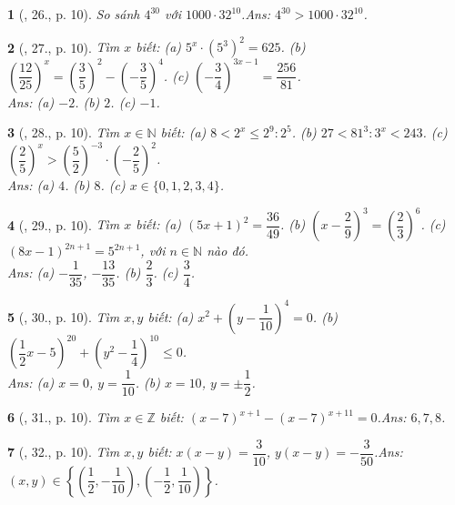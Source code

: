 \documentclass{article}
\newtheorem{baitoan}{}
\begin{document}
\begin{baitoan}[\cite{Tuyen_Toan_7}, 26., p. 10]
	So sánh $4^{30}$ với $1000\cdot 32^{10}$.\hfill{\sf Ans: $4^{30} > 1000\cdot 32^{10}$.}
\end{baitoan}

\begin{baitoan}[\cite{Tuyen_Toan_7}, 27., p. 10]
	Tìm $x$ biết: (a) $5^x\cdot(5^3)^2 = 625$. (b) $\left(\dfrac{12}{25}\right)^x = \left(\dfrac{3}{5}\right)^2 - \left(-\dfrac{3}{5}\right)^4$. (c) $\left(-\dfrac{3}{4}\right)^{3x - 1} = \dfrac{256}{81}$.\\\mbox{}\hfill{\sf Ans: (a) $-2$. (b) $2$. (c) $-1$.}
\end{baitoan}

\begin{baitoan}[\cite{Tuyen_Toan_7}, 28., p. 10]
	Tìm $x\in\mathbb{N}$ biết: (a) $8 < 2^x\le 2^9:2^5$. (b) $27 < 81^3:3^x < 243$. (c) $\left(\dfrac{2}{5}\right)^x > \left(\dfrac{5}{2}\right)^{-3}\cdot\left(-\dfrac{2}{5}\right)^2$.\\\mbox{}\hfill{\sf Ans: (a) $4$. (b) $8$. (c) $x\in\{0,1,2,3,4\}$.}
\end{baitoan}

\begin{baitoan}[\cite{Tuyen_Toan_7}, 29., p. 10]
	Tìm $x$ biết: (a) $(5x + 1)^2 = \dfrac{36}{49}$. (b) $\left(x - \dfrac{2}{9}\right)^3 = \left(\dfrac{2}{3}\right)^6$. (c) $(8x - 1)^{2n + 1} = 5^{2n + 1}$, với $n\in\mathbb{N}$ nào đó.\\\mbox{}\hfill{\sf Ans: (a) $-\dfrac{1}{35}$, $-\dfrac{13}{35}$. (b) $\dfrac{2}{3}$. (c) $\dfrac{3}{4}$.}
\end{baitoan}

\begin{baitoan}[\cite{Tuyen_Toan_7}, 30., p. 10]
	Tìm $x,y$ biết: (a) $x^2 + \left(y - \dfrac{1}{10}\right)^4 = 0$. (b) $\left(\dfrac{1}{2}x - 5\right)^{20} + \left(y^2 - \dfrac{1}{4}\right)^{10}\le 0$.\\\mbox{}\hfill{\sf Ans: (a) $x = 0$, $y = \dfrac{1}{10}$. (b) $x = 10$, $y = \pm\dfrac{1}{2}$.}
\end{baitoan}

\begin{baitoan}[\cite{Tuyen_Toan_7}, 31., p. 10]
	Tìm $x\in\mathbb{Z}$ biết: $(x - 7)^{x + 1} - (x - 7)^{x + 11} = 0$.\hfill{\sf Ans: $6,7,8$.}
\end{baitoan}

\begin{baitoan}[\cite{Tuyen_Toan_7}, 32., p. 10]
	Tìm $x,y$ biết: $x(x - y) = \dfrac{3}{10}$, $y(x - y) = -\dfrac{3}{50}$.\hfill{\sf Ans: $(x,y)\in\left\{\left(\dfrac{1}{2},-\dfrac{1}{10}\right),\left(-\dfrac{1}{2},\dfrac{1}{10}\right)\right\}$.}
\end{baitoan}
\end{document}
